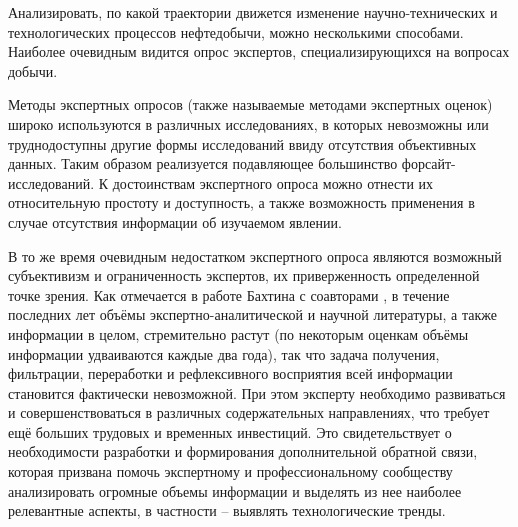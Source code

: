 Анализировать, по какой траектории движется изменение научно-технических и технологических процессов нефтедобычи, можно несколькими способами. Наиболее очевидным видится опрос экспертов, специализирующихся на вопросах добычи. 

Методы экспертных опросов (также называемые методами экспертных оценок) широко используются в различных исследованиях, в которых невозможны или труднодоступны другие формы исследований ввиду отсутствия объективных данных. Таким образом реализуется подавляющее большинство форсайт-исследований. К достоинствам экспертного опроса можно отнести их относительную простоту и доступность, а также возможность применения в случае отсутствия информации об изучаемом явлении. 

В то же время очевидным недостатком экспертного опроса являются возможный субъективизм и ограниченность экспертов, их приверженность определенной точке зрения. Как отмечается в работе Бахтина с соавторами \cite{bakhtin2017trend}, в течение последних лет объёмы экспертно-аналитической и научной литературы, а также информации в целом, стремительно растут (по некоторым оценкам объёмы информации удваиваются каждые два года), так что задача получения, фильтрации, переработки и рефлексивного восприятия всей информации становится фактически невозможной. При этом эксперту необходимо развиваться и совершенствоваться в различных содержательных направлениях, что требует ещё больших трудовых и временных инвестиций. Это свидетельствует о необходимости разработки и формирования дополнительной обратной связи, которая призвана помочь экспертному и профессиональному сообществу анализировать огромные объемы информации и выделять из нее наиболее релевантные аспекты, в частности – выявлять технологические тренды. 

